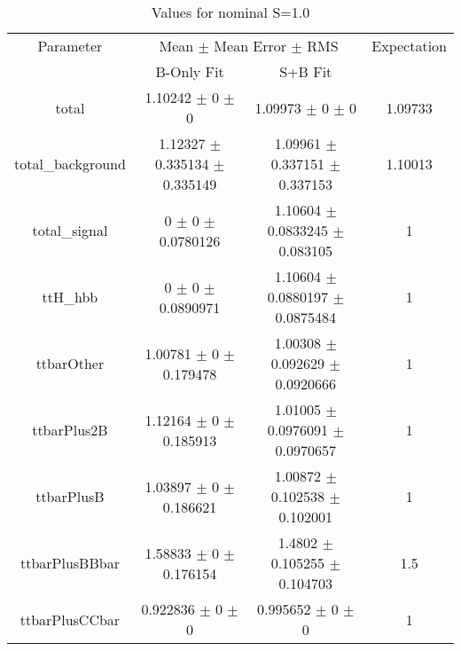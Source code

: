 \begin{table}
\centering
\caption{Values for nominal S=1.0}
\begin{tabular}{cccc}
\toprule
Parameter & \multicolumn{2}{c}{Mean $\pm$ Mean Error $\pm$ RMS} & Expectation\\
 & B-Only Fit & S+B Fit & \\
\midrule
total & \num{1.10242} $\pm$ \num{0} $\pm$ \num{0} & \num{1.09973} $\pm$ \num{0} $\pm$ \num{0} & \num{1.09733}\\
total\_background & \num{1.12327} $\pm$ \num{0.335134} $\pm$ \num{0.335149} & \num{1.09961} $\pm$ \num{0.337151} $\pm$ \num{0.337153} & \num{1.10013}\\
total\_signal & \num{0} $\pm$ \num{0} $\pm$ \num{0.0780126} & \num{1.10604} $\pm$ \num{0.0833245} $\pm$ \num{0.083105} & \num{1}\\
ttH\_hbb & \num{0} $\pm$ \num{0} $\pm$ \num{0.0890971} & \num{1.10604} $\pm$ \num{0.0880197} $\pm$ \num{0.0875484} & \num{1}\\
ttbarOther & \num{1.00781} $\pm$ \num{0} $\pm$ \num{0.179478} & \num{1.00308} $\pm$ \num{0.092629} $\pm$ \num{0.0920666} & \num{1}\\
ttbarPlus2B & \num{1.12164} $\pm$ \num{0} $\pm$ \num{0.185913} & \num{1.01005} $\pm$ \num{0.0976091} $\pm$ \num{0.0970657} & \num{1}\\
ttbarPlusB & \num{1.03897} $\pm$ \num{0} $\pm$ \num{0.186621} & \num{1.00872} $\pm$ \num{0.102538} $\pm$ \num{0.102001} & \num{1}\\
ttbarPlusBBbar & \num{1.58833} $\pm$ \num{0} $\pm$ \num{0.176154} & \num{1.4802} $\pm$ \num{0.105255} $\pm$ \num{0.104703} & \num{1.5}\\
ttbarPlusCCbar & \num{0.922836} $\pm$ \num{0} $\pm$ \num{0} & \num{0.995652} $\pm$ \num{0} $\pm$ \num{0} & \num{1}\\
\bottomrule
\end{tabular}
\end{table}
